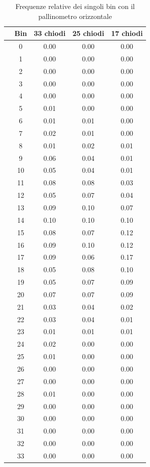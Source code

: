 \documentclass[10pt,oneside,a4paper]{article}
\begin{document}
\begin{table}[H]
\caption{Frequenze relative dei singoli bin con il pallinometro orizzontale}
\label{tab:freq_rel_orizzontale}
\centering
\begin{tabular}{ccccc}
\hline
 & Bin & 33 chiodi & 25 chiodi & 17 chiodi \\   
  \hline
&0 & 0.00 & 0.00 & 0.00 \\
&1 & 0.00 & 0.00 & 0.00 \\ 
 & 2 & 0.00 & 0.00 & 0.00 \\ 
  &3 & 0.00 & 0.00 & 0.00 \\ 
  &4 & 0.00 & 0.00 & 0.00 \\ 
  &5 & 0.01 & 0.00 & 0.00 \\ 
  &6 & 0.01 & 0.01 & 0.00 \\ 
  &7 & 0.02 & 0.01 & 0.00 \\ 
  &8 & 0.01 & 0.02 & 0.01 \\ 
  &9 & 0.06 & 0.04 & 0.01 \\ 
  &10 & 0.05 & 0.04 & 0.01 \\ 
  &11 & 0.08 & 0.08 & 0.03 \\ 
  &12 & 0.05 & 0.07 & 0.04 \\ 
  &13 & 0.09 & 0.10 & 0.07 \\ 
  &14 & 0.10 & 0.10 & 0.10 \\ 
  &15 & 0.08 & 0.07 & 0.12 \\ 
  &16 & 0.09 & 0.10 & 0.12 \\ 
  &17 & 0.09 & 0.06 & 0.17 \\ 
  &18 & 0.05 & 0.08 & 0.10 \\ 
  &19 & 0.05 & 0.07 & 0.09 \\ 
  &20 & 0.07 & 0.07 & 0.09 \\ 
  &21 & 0.03 & 0.04 & 0.02 \\ 
  &22 & 0.03 & 0.04 & 0.01 \\ 
  &23 & 0.01 & 0.01 & 0.01 \\ 
  &24 & 0.02 & 0.00 & 0.00 \\ 
  &25 & 0.01 & 0.00 & 0.00 \\ 
  &26 & 0.00 & 0.00 & 0.00 \\ 
  &27 & 0.00 & 0.00 & 0.00 \\ 
  &28 & 0.01 & 0.00 & 0.00 \\ 
  &29 & 0.00 & 0.00 & 0.00 \\ 
  &30 & 0.00 & 0.00 & 0.00 \\ 
  &31 & 0.00 & 0.00 & 0.00 \\ 
  &32 & 0.00 & 0.00 & 0.00 \\ 
  &33 & 0.00 & 0.00 & 0.00 \\ 
   \hline
\end{tabular}
\end{table}
\end{document}
